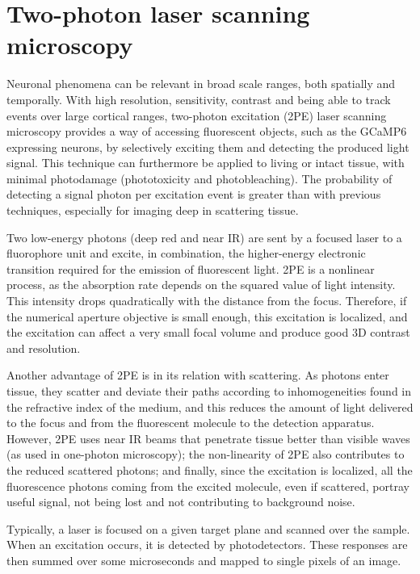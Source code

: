 \section{Two-photon laser scanning microscopy}
\label{sec:sectionc}

Neuronal phenomena can be relevant in broad scale ranges, both spatially and temporally. With high resolution, sensitivity, contrast and being able to track events over large cortical ranges, two-photon excitation (2PE) laser scanning microscopy provides a way of accessing fluorescent objects, such as the GCaMP6 expressing neurons, by selectively exciting them and detecting the produced light signal. This technique can furthermore be applied to living or intact tissue, with minimal photodamage (phototoxicity and photobleaching). The probability of detecting a signal photon per excitation event is greater than with previous techniques, especially for imaging deep in scattering tissue.

Two low-energy photons (deep red and near IR) are sent by a focused laser to a fluorophore unit and excite, in combination, the higher-energy electronic transition required for the emission of fluorescent light. 2PE is a nonlinear process, as the absorption rate depends on the squared value of light intensity. This intensity drops quadratically with the distance from the focus. Therefore, if the numerical aperture objective is small enough, this excitation is localized, and the excitation can affect a very small focal volume and produce good 3D contrast and resolution.

Another advantage of 2PE is in its relation with scattering. As photons enter tissue, they scatter and deviate their paths according to inhomogeneities found in the refractive index of the medium, and this reduces the amount of light delivered to the focus and from the fluorescent molecule to the detection apparatus. However, 2PE uses near IR beams that penetrate tissue better than visible waves (as used in one-photon microscopy); the non-linearity of 2PE also contributes to the reduced scattered photons; and finally, since the excitation is localized, all the fluorescence photons coming from the excited molecule, even if scattered, portray useful signal, not being lost and not contributing to background noise.

Typically, a laser is focused on a given target plane and scanned over the sample. When an excitation occurs, it is detected by photodetectors. These responses are then summed over some microseconds and mapped to single pixels of an image.

